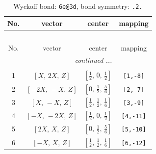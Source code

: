 \documentclass[fleqn,8pt]{jsarticle}
\begin{document}
\renewcommand{\arraystretch}{1.2}
\begin{longtable}{cccc}
\caption{Wyckoff bond: {\tt 6e@3d}, bond symmetry: {\tt .2.}}
 \\
 \hline \hline
No. & vector & center & mapping \\ \hline \endfirsthead

\multicolumn{3}{l}{\tablename\ \thetable{}} \\
 \hline \hline
No. & vector & center & mapping \\ \hline \endhead

 \hline \hline
\multicolumn{3}{r}{\footnotesize\it continued ...} \\ \endfoot

 \hline \hline
\multicolumn{3}{r}{} \\ \endlastfoot

1 & $\left[ X,\, 2 X,\, Z \right]$ & $\left[ \frac{1}{2},\, 0,\, \frac{1}{2} \right]$ & {\tt [1,-8]} \\ \hline
2 & $\left[ - 2 X,\, - X,\, Z \right]$ & $\left[ 0,\, \frac{1}{2},\, \frac{5}{6} \right]$ & {\tt [2,-7]} \\ \hline
3 & $\left[ X,\, - X,\, Z \right]$ & $\left[ \frac{1}{2},\, \frac{1}{2},\, \frac{1}{6} \right]$ & {\tt [3,-9]} \\ \hline
4 & $\left[ - X,\, - 2 X,\, Z \right]$ & $\left[ \frac{1}{2},\, 0,\, \frac{1}{2} \right]$ & {\tt [4,-11]} \\ \hline
5 & $\left[ 2 X,\, X,\, Z \right]$ & $\left[ 0,\, \frac{1}{2},\, \frac{5}{6} \right]$ & {\tt [5,-10]} \\ \hline
6 & $\left[ - X,\, X,\, Z \right]$ & $\left[ \frac{1}{2},\, \frac{1}{2},\, \frac{1}{6} \right]$ & {\tt [6,-12]} \\
\end{longtable}
\renewcommand{\arraystretch}{1.2}
\end{document}
